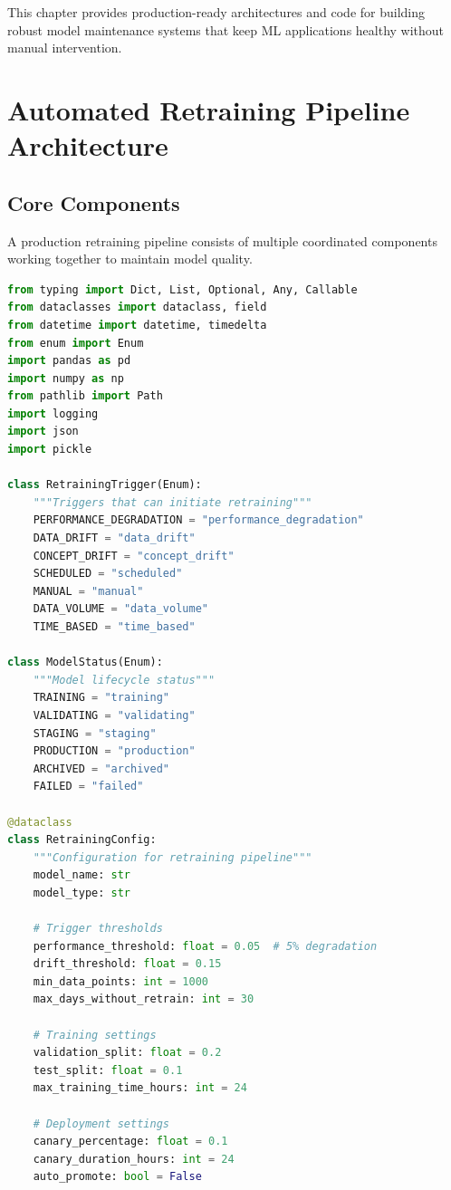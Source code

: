 This chapter provides production-ready architectures and code for building robust model maintenance systems that keep ML applications healthy without manual intervention.

\section{Automated Retraining Pipeline Architecture}

\subsection{Core Components}

A production retraining pipeline consists of multiple coordinated components working together to maintain model quality.

\begin{lstlisting}[language=Python, caption=Complete Automated Retraining Pipeline]
from typing import Dict, List, Optional, Any, Callable
from dataclasses import dataclass, field
from datetime import datetime, timedelta
from enum import Enum
import pandas as pd
import numpy as np
from pathlib import Path
import logging
import json
import pickle

class RetrainingTrigger(Enum):
    """Triggers that can initiate retraining"""
    PERFORMANCE_DEGRADATION = "performance_degradation"
    DATA_DRIFT = "data_drift"
    CONCEPT_DRIFT = "concept_drift"
    SCHEDULED = "scheduled"
    MANUAL = "manual"
    DATA_VOLUME = "data_volume"
    TIME_BASED = "time_based"

class ModelStatus(Enum):
    """Model lifecycle status"""
    TRAINING = "training"
    VALIDATING = "validating"
    STAGING = "staging"
    PRODUCTION = "production"
    ARCHIVED = "archived"
    FAILED = "failed"

@dataclass
class RetrainingConfig:
    """Configuration for retraining pipeline"""
    model_name: str
    model_type: str

    # Trigger thresholds
    performance_threshold: float = 0.05  # 5% degradation
    drift_threshold: float = 0.15
    min_data_points: int = 1000
    max_days_without_retrain: int = 30

    # Training settings
    validation_split: float = 0.2
    test_split: float = 0.1
    max_training_time_hours: int = 24

    # Deployment settings
    canary_percentage: float = 0.1
    canary_duration_hours: int = 24
    auto_promote: bool = False


\end{lstlisting}
